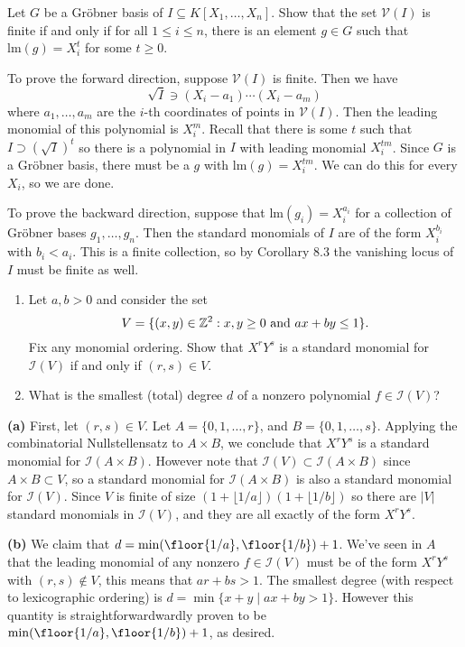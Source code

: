 \documentclass[11pt,letterpaper]{article}
\providecommand{\lm}{\mathrm{lm}}
\begin{document}
\begin{problem}
    Let $G$ be a Gr\"{o}bner basis of $I\subseteq K[X_1,\dots,X_n]$. Show that the set $\mathcal V(I)$ is finite if and only if for all $1\leq i\leq n$, there is an element $g\in G$ such that $\lm(g)=X_i^t$ for some $t\geq0$.
\end{problem}

\begin{solution}
    To prove the forward direction, suppose $\mathcal{V}(I)$ is finite. Then we have 
    \[
        \sqrt{I} \ni (X_i-a_1)\cdots (X_i-a_m)
    \]
    where $a_1,\ldots, a_m$ are the $i$-th coordinates of points in $\mathcal{V}(I)$. Then the leading monomial of this polynomial is $X_i^m$. Recall that there is some $t$ such that $I\supset(\sqrt{I})^t$ so there is a polynomial in $I$ with leading monomial $X_i^{tm}$. Since $G$ is a Gr\"obner basis, there must be a $g$ with $\lm(g)=X_i^{tm}$. We can do this for every $X_i$, so we are done.

    To prove the backward direction, suppose that $\lm(g_i)=X^{a_i}_i$ for a collection of Gr\"obner bases $g_1,\ldots,g_n$. Then the standard monomials of $I$ are of the form $X^{b_i}_i$ with $b_i < a_i$. This is a finite collection, so by Corollary 8.3 the vanishing locus of $I$ must be finite as well.
\end{solution}

\begin{problem}\noindent
    \begin{enumerate}[label=\alph*)]
        \item Let $a,b>0$ and consider the set
        \[
        V=\{(x,y)\in\mathbb Z^2: x,y\geq0\textnormal{ and }ax+by\leq1\}.
        \]
        Fix any monomial ordering. Show that $X^rY^s$ is a standard monomial for $\mathcal I(V)$ if and only if $(r,s)\in V$.
        \item What is the smallest (total) degree $d$ of a nonzero polynomial $f\in\mathcal I(V)$?
    \end{enumerate}
\end{problem}

\begin{solution}
    \textbf{(a)} First, let $(r,s)\in V$. Let $A=\{0,1,\ldots, r\}$, and $B=\{0,1,\ldots, s\}$. Applying the combinatorial Nullstellensatz to $A\times B$, we conclude that $X^rY^s$ is a standard monomial for $\mathcal{I}(A\times B)$. However note that $\mathcal{I}(V)\subset \mathcal{I}(A\times B)$ since $A\times B\subset V$, so a standard monomial for $\mathcal{I}(A\times B)$ is also a standard monomial for $\mathcal{I}(V)$. Since $V$ is finite of size $(1+\lfloor1/a\rfloor)(1+\lfloor1/b\rfloor)$ so there are $|V|$ standard monomials in $ \mathcal{I} (V)$, and they are all exactly of the form $X^rY^s$.

    \textbf{(b)} We claim that $d=\min(\floor{1/a}, \floor{1/b})+1$. We've seen in $A$ that the leading monomial of any nonzero $f\in \mathcal{I}(V)$ must be of the form $X^rY^s$ with $(r,s)\not\in V$, this means that $ar+bs>1$. The smallest degree (with respect to lexicographic ordering) is $d=\min\{x+y\mid ax+by>1\}$. However this quantity is straightforwardwardly proven to be $\min(\floor{1/a}, \floor{1/b})+1$, as desired.
\end{solution}
\end{document}
